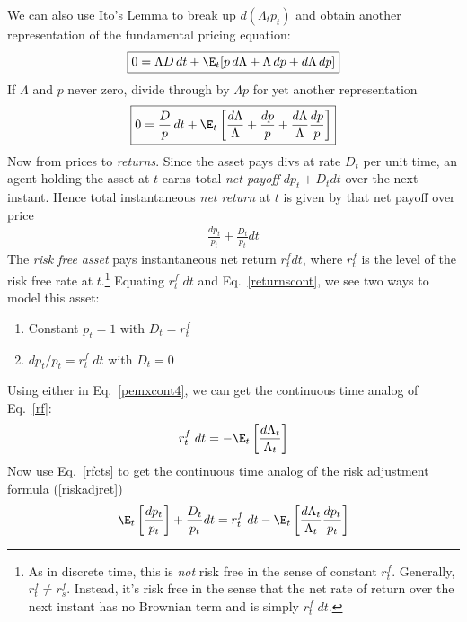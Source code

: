 \documentclass[12pt]{article}
\theoremstyle{plain}
\theoremstyle{definition}
\theoremstyle{remark}
\begin{document}
\begin{multicols*}{2}
We can also use Ito's Lemma to break up $d(\Lambda_tp_t)$ and obtain
another representation of the fundamental pricing equation:
\begin{align}
  \boxed{%
  0 = \Lambda D \,dt
  + \E_t[p \,d\Lambda + \Lambda \, dp + d\Lambda \,dp]
  }
  \label{pemxcont3}
\end{align}
If $\Lambda$ and $p$ never zero, divide through by $\Lambda p$
for yet another representation
\begin{align}
  \boxed{%
  0 = \frac{D}{p} \,dt
  + \E_t\left[
    \frac{d\Lambda}{\Lambda} + \frac{dp}{p}
    + \frac{d\Lambda}{\Lambda}\frac{dp}{p}
    \right]
  }
  \label{pemxcont4}
\end{align}
Now from prices to \emph{returns}.
Since the asset pays divs at rate $D_t$ per unit time, an agent
holding the asset at $t$ earns total \emph{net payoff} $dp_t + D_t dt$
over the next instant. Hence total instantaneous \emph{net return} at
$t$
is given by that net payoff over price
\begin{align}
  \frac{dp_t}{p_t}
  + \frac{D_t}{p_t} dt
  \label{returnscont}
\end{align}
The \emph{risk free asset} pays instantaneous net return
$r^f_t dt$,
where $r^f_t$ is the level of the risk free rate at
$t$.\footnote{%
  As in discrete time, this is \emph{not} risk free in the sense of
  constant $r^f_t$. Generally, $r^f_t\neq r^f_s$.
  Instead, it's risk free in the sense that the net rate of return over
  the next instant has no Brownian term and is simply $r^f_t\;dt$.
}
Equating $r^f_t\;dt$ and Eq.~\ref{returnscont}, we see two ways to model
this asset:
\begin{enumerate}[label=(\roman*)]
  \item Constant $p_t=1$ with $D_t=r_t^f$
  \item $dp_t/p_t=r^f_t\;dt$ with $D_t=0$
\end{enumerate}
Using either in Eq.~\ref{pemxcont4}, we can get the continuous time
analog of Eq.~\ref{rf}:
\begin{align}
  r^f_t\;dt =
  -\E_t\left[ \frac{d\Lambda_t}{\Lambda_t} \right]
  \label{rfcts}
\end{align}
Now use Eq.~\ref{rfcts} to get the continuous time analog of the risk
adjustment formula (\ref{riskadjret})
\begin{align*}
  \E_t\left[
     \frac{dp_t}{p_t}
  \right]
  +
  \frac{D_t}{p_t} dt
  =
  r^f_t\;dt
  - \E_t\left[
     \frac{d\Lambda_t}{\Lambda_t}\frac{dp_t}{p_t}
    \right]
\end{align*}



\end{multicols*}
\end{document}
